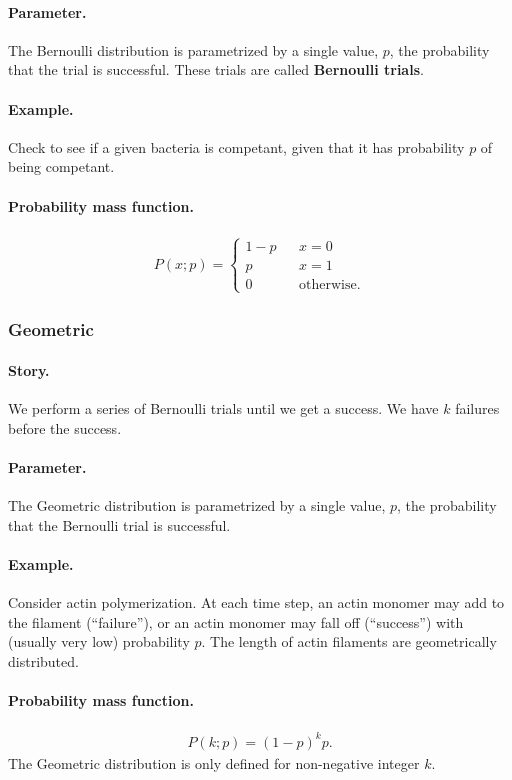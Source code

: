 \paragraph{Parameter.} The Bernoulli distribution is parametrized by a
single value, $p$, the probability that the trial is successful.
These trials are called \textbf{Bernoulli trials}.
\paragraph{Example.} Check to see if a given bacteria is competant,
given that it has probability $p$ of being competant.
\paragraph{Probability mass function.}
\begin{align}
P(x;p) = \left\{ \begin{array}{ccc}
1-p & & x = 0 \\[0.5em]
p & & x = 1 \\[0.5em]
0 & & \text{otherwise.}
\end{array}
\right.
\end{align}


\subsubsection{Geometric}
\paragraph{Story.} We perform a series of Bernoulli trials until we
get a success.  We have $k$ failures before the success.
\paragraph{Parameter.} The Geometric distribution is parametrized by a
single value, $p$, the probability that the Bernoulli trial is
successful.
\paragraph{Example.} Consider actin polymerization.  At each time
step, an actin monomer may add to the filament (``failure''), or an
actin monomer may fall off (``success'') with (usually very low)
probability $p$.  The length of actin filaments are geometrically
distributed.
\paragraph{Probability mass function.}
\begin{align}
P(k;p) = (1-p)^k p.
\end{align}
The Geometric distribution is only defined for non-negative
integer $k$.



